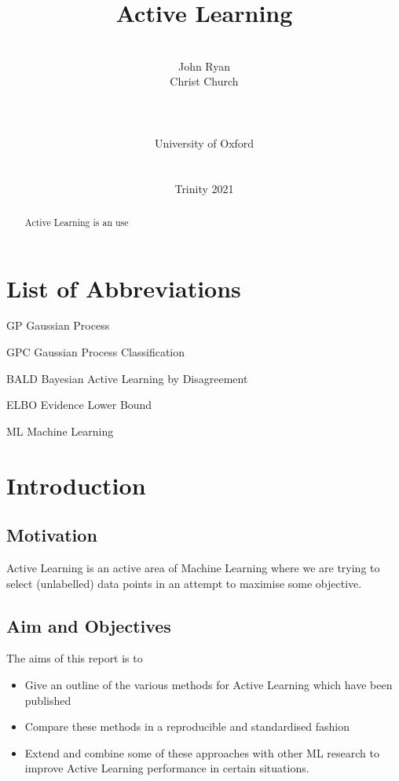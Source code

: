 \documentclass[12pt, a4paper]{report}
\date{}
\title{Active Learning}
\author{\\ \Large{John Ryan}
\\ Christ Church
\\
\\
\\
\\ University of Oxford
\\
\\ \\
Trinity 2021
}
\begin{document}

\thispagestyle{headings}
	\maketitle
\FloatBarrier
{}



\thispagestyle{empty}
\begin{abstract}

Active Learning is an use

\end{abstract}
\tableofcontents
\thispagestyle{plain}
\listoffigures
\listoftables

\chapter*{List of Abbreviations}
\begin{abbreviations}
    \item[GP] Gaussian Process
    \item[GPC] Gaussian Process Classification
    \item[BALD] Bayesian Active Learning by Disagreement
    \item[ELBO] Evidence Lower Bound
    \item[ML] Machine Learning
\end{abbreviations}

\chapter{Introduction}
\section{Motivation}

Active Learning is an active area of Machine Learning where we are trying to select (unlabelled) data points in an attempt to maximise some objective.
\section{Aim and Objectives}

The aims of this report is to

\begin{itemize}
    \item Give an outline of the various methods for Active Learning which have been published
    \item Compare these methods in a reproducible and standardised fashion
    \item Extend and combine some of these approaches with other ML research to improve Active Learning performance in certain situations.
\end{itemize}
\end{document}
